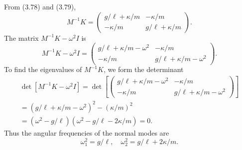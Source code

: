 \documentclass[main.tex]{subfiles}
\begin{document}
From (3.78) and (3.79),
$$
M^{-1} K=\left(\begin{array}{cc}
g / \ell+\kappa / m & -\kappa / m \\
-\kappa / m & g / \ell+\kappa / m
\end{array}\right) .
$$
The matrix $M^{-1} K-\omega^2 I$ is
$$
M^{-1} K-\omega^2 I=\left(\begin{array}{cc}
g / \ell+\kappa / m-\omega^2 & -\kappa / m \\
-\kappa / m & g / \ell+\kappa / m-\omega^2
\end{array}\right) .
$$
To find the eigenvalues of $M^{-1} K$, we form the determinant
$$
\begin{gathered}
\operatorname{det}\left[M^{-1} K-\omega^2 I\right]=\operatorname{det}\left[\left(\begin{array}{cc}
g / \ell+\kappa / m-\omega^2 & -\kappa / m \\
-\kappa / m & g / \ell+\kappa / m-\omega^2
\end{array}\right)\right] \\
=\left(g / \ell+\kappa / m-\omega^2\right)^2-(\kappa / m)^2 \\
=\left(\omega^2-g / \ell\right)\left(\omega^2-g / \ell-2 \kappa / m\right)=0 .
\end{gathered}
$$
Thus the angular frequencies of the normal modes are
$$
\omega_1^2=g / \ell, \quad \omega_2^2=g / \ell+2 \kappa / m .
$$
\end{document}
